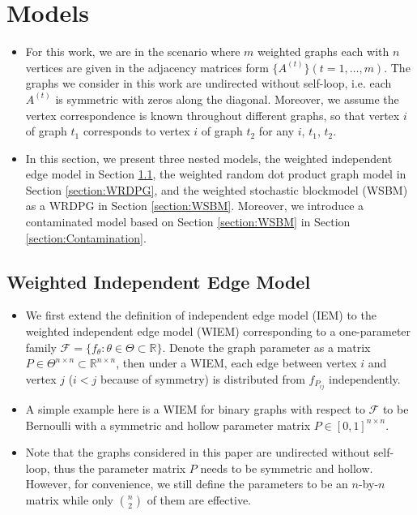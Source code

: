 \documentclass[a4paper]{article}
\begin{document}
\section{Models}
\label{section:model}
\begin{itemize}
\item For this work, we are in the scenario where $m$ weighted graphs each with $n$ vertices are given in the adjacency matrices form $\{ A^{(t)} \} (t = 1, \dotsc, m)$. The graphs we consider in this work are undirected without self-loop, i.e. each $A^{(t)}$ is symmetric with zeros along the diagonal. Moreover, we assume the vertex correspondence is known throughout different graphs, so that vertex $i$ of graph $t_1$ corresponds to vertex $i$ of graph $t_2$ for any $i$, $t_1$, $t_2$.
\item In this section, we present three nested models, the weighted independent edge model in Section \ref{section:WIEM}, the weighted random dot product graph model in Section \ref{section:WRDPG}, and the weighted stochastic blockmodel (WSBM) as a WRDPG in Section \ref{section:WSBM}. Moreover, we introduce a contaminated model based on Section \ref{section:WSBM} in Section \ref{section:Contamination}.
\end{itemize}

\subsection{Weighted Independent Edge Model}
\label{section:WIEM}
\begin{itemize}
\item We first extend the definition of independent edge model (IEM) \cite{bollobas2007phase} to the weighted independent edge model (WIEM) corresponding to a one-parameter family $\mathcal{F} = \{ f_{\theta} : \theta \in \Theta \subset \mathbb{R} \}$. Denote the graph parameter as a matrix $P \in \Theta^{n \times n} \subset \mathbb{R}^{n \times n}$, then under a WIEM, each edge between vertex $i$ and vertex $j$ ($i < j$ because of symmetry) is distributed from $f_{P_{ij}}$ independently.
\item A simple example here is a WIEM for binary graphs with respect to $\mathcal{F}$ to be Bernoulli with a symmetric and hollow parameter matrix $P \in [0, 1]^{n \times n}$.
\item Note that the graphs considered in this paper are undirected without self-loop, thus the parameter matrix $P$ needs to be symmetric and hollow. However, for convenience, we still define the parameters to be an $n$-by-$n$ matrix while only $n \choose 2$ of them are effective.
\end{itemize}
\end{document}
